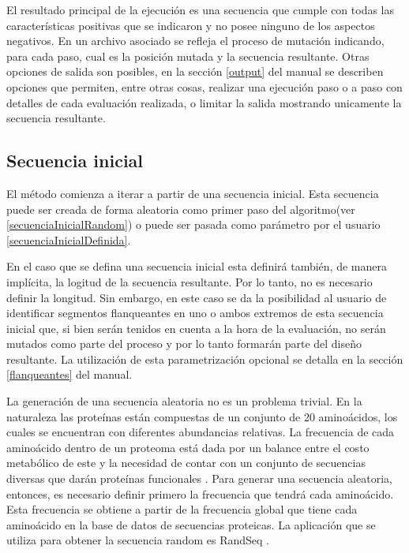 El resultado principal de la ejecución es una secuencia que cumple con todas las características positivas que se indicaron y no posee ninguno de los aspectos negativos.
En un archivo asociado se refleja el proceso de mutación indicando, para cada paso, cual es la posición mutada y la secuencia resultante.
Otras opciones de salida son posibles, en la sección \ref{output} del manual se describen opciones que permiten, entre otras cosas, realizar una ejecución paso o a paso con detalles de cada evaluación realizada, 
o limitar la salida mostrando unicamente la secuencia resultante.

\subsection{Secuencia inicial}\label{seqInicial}

El método comienza a iterar a partir de una secuencia inicial. 
Esta secuencia puede ser creada de forma aleatoria como primer paso del 
algoritmo(ver \ref{secuenciaInicialRandom}) o puede ser pasada como parámetro por el usuario \ref{secuenciaInicialDefinida}. 

En el caso que se defina una secuencia inicial esta definirá también, de manera implícita, la logitud de la secuencia resultante. Por lo tanto, no es necesario definir la longitud.
Sin embargo, en este caso se da la posibilidad al usuario de identificar segmentos flanqueantes en uno o ambos extremos de esta secuencia inicial que, si bien serán tenidos en cuenta a la hora de la evaluación,
no serán mutados como parte del proceso y por lo tanto formarán parte del diseño resultante. 
La utilización de esta parametrización opcional se detalla en la sección \ref{flanqueantes} del manual.

La generación de una secuencia aleatoria no es un problema trivial. 
En la naturaleza las proteínas están compuestas de un conjunto de 20 aminoácidos, los cuales se encuentran con diferentes abundancias relativas. 
La frecuencia de cada aminoácido dentro de un proteoma está dada por un balance entre el costo metabólico de este y la necesidad de contar con un conjunto de secuencias diversas que darán proteínas funcionales \cite{krick2014amino}. 
Para generar una secuencia aleatoria, entonces, es necesario definir primero la frecuencia que tendrá cada aminoácido. 
Esta frecuencia se obtiene a partir de la frecuencia global que tiene cada aminoácido en la base de datos de secuencias proteicas.
La aplicación que se utiliza para obtener la secuencia random es RandSeq \cite{randseq}.

